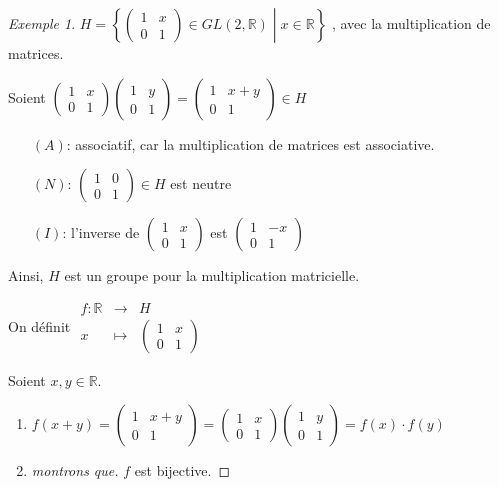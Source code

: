 \documentclass{report}
\theoremstyle{definition}
\theoremstyle{remark}
\newtheorem*{exem}{Exemple}
\begin{document}
	\begin{exem}
		\(
		H= \left\lbrace \begin{pmatrix}
			1&x\\0&1
		\end{pmatrix} \in GL(2, \mathbb{R}) \middle| x \in \mathbb{R} \right\rbrace
		\)
		, avec la multiplication de matrices.

		Soient $\begin{pmatrix}
			1&x\\0&1
		\end{pmatrix} \begin{pmatrix}
			1&y\\0&1
		\end{pmatrix} = \begin{pmatrix}
			1&x+y\\0&1
		\end{pmatrix} \in H$
		\begin{itemize}
			\item[$(A)$:] associatif, car la multiplication de matrices est associative.
			\item[$(N)$:] $\begin{pmatrix}
				1&0\\0&1
			\end{pmatrix} \in H$ est neutre
			\item[$(I)$:] l'inverse de $\begin{pmatrix}
				1&x\\0&1
			\end{pmatrix}$ est $\begin{pmatrix}
				1&-x\\0&1
			\end{pmatrix}$
		\end{itemize}
		Ainsi, $H$ est un groupe pour la multiplication matricielle.

		On d\'efinit
		$\begin{array}{rcl}
			f:\mathbb{R} &\to& H\\
			x&\mapsto&\begin{pmatrix}
				1&x\\0&1
			\end{pmatrix}
		\end{array}$

		Soient $x,y \in \mathbb{R}$.
		\begin{enumerate}[label=(\arabic*)]
			\item $f(x+y) = \begin{pmatrix}
				1&x+y\\0&1
			\end{pmatrix} = \begin{pmatrix}
			1&x\\0&1
			\end{pmatrix} \begin{pmatrix}
			1&y\\0&1
			\end{pmatrix} = f(x) \cdot f(y)$
			\item
			\begin{proof}[montrons que]
				$f$ est bijective.


\end{proof}
\end{enumerate}
\end{exem}
\end{document}

